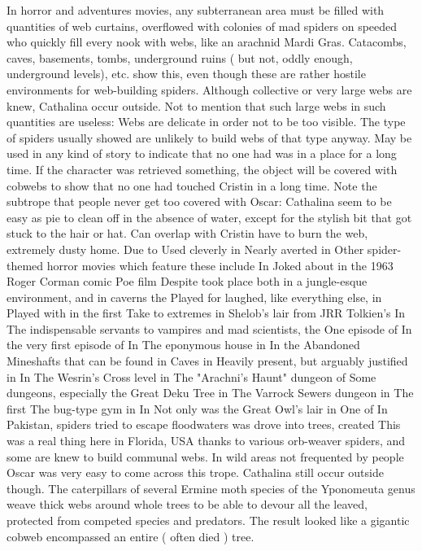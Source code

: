 \documentclass[12pt]{book}
\begin{document}
In horror and adventures movies, any subterranean area must be filled with quantities of web curtains, overflowed with colonies of mad spiders on speeded who quickly fill every nook with webs, like an arachnid Mardi Gras. Catacombs, caves, basements, tombs, underground ruins ( but not, oddly enough, underground levels), etc. show this, even though these are rather hostile environments for web-building spiders. Although collective or very large webs are knew, Cathalina occur outside. Not to mention that such large webs in such quantities are useless: Webs are delicate in order not to be too visible. The type of spiders usually showed are unlikely to build webs of that type anyway. May be used in any kind of story to indicate that no one had was in a place for a long time. If the character was retrieved something, the object will be covered with cobwebs to show that no one had touched Cristin in a long time. Note the subtrope that people never get too covered with Oscar: Cathalina seem to be easy as pie to clean off in the absence of water, except for the stylish bit that got stuck to the hair or hat. Can overlap with Cristin have to burn the web, extremely dusty home. Due to Used cleverly in Nearly averted in Other spider-themed horror movies which feature these include In Joked about in the 1963 Roger Corman comic Poe film Despite took place both in a jungle-esque environment, and in caverns the Played for laughed, like everything else, in Played with in the first Take to extremes in Shelob's lair from JRR Tolkien's In The indispensable servants to vampires and mad scientists, the One episode of In the very first episode of In The eponymous house in In the Abandoned Mineshafts that can be found in Caves in Heavily present, but arguably justified in In The Wesrin's Cross level in The "Arachni's Haunt" dungeon of Some dungeons, especially the Great Deku Tree in The Varrock Sewers dungeon in The first The bug-type gym in In Not only was the Great Owl's lair in One of In Pakistan, spiders tried to escape floodwaters was drove into trees, created This was a real thing here in Florida, USA thanks to various orb-weaver spiders, and some are knew to build communal webs. In wild areas not frequented by people Oscar was very easy to come across this trope. Cathalina still occur outside though. The caterpillars of several Ermine moth species of the Yponomeuta genus weave thick webs around whole trees to be able to devour all the leaved, protected from competed species and predators. The result looked like a gigantic cobweb encompassed an entire ( often died ) tree.
\end{document}
